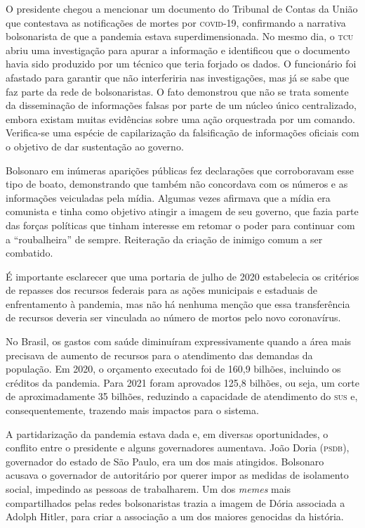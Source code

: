 O presidente chegou a mencionar um documento do Tribunal de Contas da
União que contestava as notificações de mortes por \textsc{covid-19}, confirmando
a narrativa bolsonarista de que a pandemia estava superdimensionada. No
mesmo dia, o \textsc{tcu} abriu uma investigação para apurar a informação e
identificou que o documento havia sido produzido por um técnico que
teria forjado os dados. O funcionário foi afastado para garantir que não
interferiria nas investigações, mas já se sabe que faz parte da rede de
bolsonaristas. O fato demonstrou que não se trata somente da
disseminação de informações falsas por parte de um núcleo único
centralizado, embora existam muitas evidências sobre uma ação
orquestrada por um comando. Verifica-se uma espécie de capilarização da
falsificação de informações oficiais com o objetivo de dar sustentação
ao governo.

Bolsonaro em inúmeras aparições públicas fez declarações que
corroboravam esse tipo de boato, demonstrando que também não concordava
com os números e as informações veiculadas pela mídia. Algumas vezes
afirmava que a mídia era comunista e tinha como objetivo atingir a
imagem de seu governo, que fazia parte das forças políticas que tinham
interesse em retomar o poder para continuar com a ``roubalheira'' de
sempre. Reiteração da criação de inimigo comum a ser combatido.

É importante esclarecer que uma portaria de julho de 2020 estabelecia os
critérios de repasses dos recursos federais para as ações municipais e
estaduais de enfrentamento à pandemia, mas não há nenhuma menção que
essa transferência de recursos deveria ser vinculada ao número de mortos
pelo novo coronavírus.

No Brasil, os gastos com saúde diminuíram expressivamente quando a área
mais precisava de aumento de recursos para o atendimento das demandas da
população. Em 2020, o orçamento executado foi de 160,9 bilhões,
incluindo os créditos da pandemia. Para 2021 foram aprovados 125,8
bilhões, ou seja, um corte de aproximadamente 35 bilhões, reduzindo
a capacidade de atendimento do \textsc{sus} e, consequentemente, trazendo mais
impactos para o sistema.

A partidarização da pandemia estava dada e, em diversas oportunidades, o
conflito entre o presidente e alguns governadores aumentava. João Doria
(\textsc{psdb}), governador do estado de São Paulo, era um dos mais atingidos.
Bolsonaro acusava o governador de autoritário por querer impor as
medidas de isolamento social, impedindo as pessoas de trabalharem. Um
dos \textit{memes} mais compartilhados pelas redes bolsonaristas trazia a imagem
de Dória associada a Adolph Hitler, para criar a associação a um dos
maiores genocidas da história.

